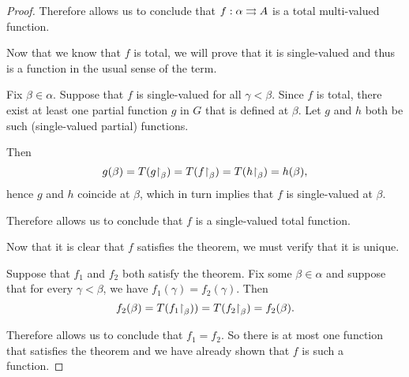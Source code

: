 \begin{proof}
  Therefore  allows us to conclude that \( f: \alpha \rightrightarrows A \) is a total multi-valued function.

   Now that we know that \( f \) is total, we will prove that it is single-valued and thus is a function in the usual sense of the term.

  Fix \( \beta \in \alpha \). Suppose that \( f \) is single-valued for all \( \gamma < \beta \). Since \( f \) is total, there exist at least one partial function \( g \) in \( G \) that is defined at \( \beta \). Let \( g \) and \( h \) both be such (single-valued partial) functions.

  Then
  \begin{equation*}
    g(\beta) = T(g{\upharpoonright}_\beta) = T(f{\upharpoonright}_\beta) = T(h{\upharpoonright}_\beta) = h(\beta),
  \end{equation*}
  hence \( g \) and \( h \) coincide at \( \beta \), which in turn implies that \( f \) is single-valued at \( \beta \).

  Therefore  allows us to conclude that \( f \) is a single-valued total function.

   Now that it is clear that \( f \) satisfies the theorem, we must verify that it is unique.

  Suppose that \( f_1 \) and \( f_2 \) both satisfy the theorem. Fix some \( \beta \in \alpha \) and suppose that for every \( \gamma < \beta \), we have \( f_1(\gamma) = f_2(\gamma) \). Then
  \begin{equation*}
    f_2(\beta) = T(f_1{\upharpoonright}_\beta)) = T(f_2{\upharpoonright}_\beta) = f_2(\beta).
  \end{equation*}

  Therefore  allows us to conclude that \( f_1 = f_2 \). So there is at most one function that satisfies the theorem and we have already shown that \( f \) is such a function.
\end{proof}

